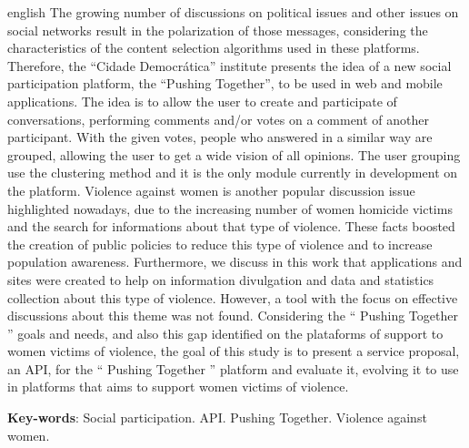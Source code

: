 \begin{resumo}[Abstract]
 \begin{otherlanguage*}{english}
  The growing number of discussions on political issues and other issues on social networks
  result in the polarization of those messages, considering the characteristics 
  of the content selection algorithms used in these platforms. Therefore,
  the ``Cidade Democrática'' institute presents the idea of a new social participation 
  platform, the ``Pushing Together'', to be used in web and mobile applications.
  The idea is to allow the user to create and participate of conversations, performing 
  comments and/or votes on a comment of another participant. With the given votes, people 
  who answered in a similar way are grouped, allowing the user to get a wide 
  vision of all opinions. The user grouping use the clustering method and it is the only
  module currently in development on the platform.
  Violence against women is another popular discussion issue highlighted nowadays, due to
  the increasing number of women homicide victims and the search 
  for informations about that type of violence. These facts boosted the creation of public policies
  to reduce this type of violence and to increase population awareness.
  Furthermore, we discuss in this work that
  applications and sites were created to help on information divulgation and
  data and statistics collection about this type of violence.
  However, a tool with the focus on effective discussions about this theme was not found. 
  Considering the `` Pushing Together '' goals and needs, and also this gap identified on
  the plataforms of support to women victims of violence, 
  the goal of this study is to present a service proposal, an API, for the `` Pushing Together ''
  platform and evaluate it, evolving it to use in platforms that aims to support women victims of violence.
  
  
   \vspace{\onelineskip}
 
   \noindent 
   \textbf{Key-words}: Social participation. API. Pushing Together. Violence against women.
 \end{otherlanguage*}
\end{resumo}
